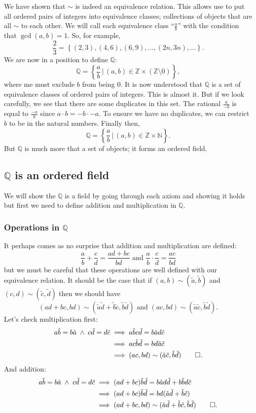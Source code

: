\documentclass[]{scrartcl}
\theoremstyle{definition}
\newcommand{\bb}[1]{\mathbb{#1}}
\newcommand{\Z}{\bb{Z}}
\newcommand{\Q}{\bb{Q}}
\newcommand{\N}{\bb{N}}
\newcommand{\AND}{\;\wedge\;}
\begin{document}
We have shown that $\sim$ is indeed an equivalence relation. This allows use to put all ordered pairs of integers into equivalence classes; collections of objects that are all $\sim$ to each other. We will call each equivalence class ``$\frac{a}{b}$'' with the condition that $\gcd(a,b) = 1$. So, for example,
$$
\frac{2}{3} = \left\{ (2, 3), (4, 6), (6,9), ..., (2n, 3n), ... \right\}.
$$
We are now in a position to define $\Q$:
$$
\Q = \left\{ \frac{a}{b}\,|\,(a,b)\in \Z \times (\Z \setminus 0) \right\},
$$
where me must exclude $b$ from being $0$. It is now understood that $\Q$ is a set of equivalence classes of ordered pairs of integers. This is almost it. But if we look carefully, we see that there are some duplicates in this set. The rational $\frac{a}{-b}$ is equal to $\frac{-a}{b}$ since $a\cdot b = -b\cdot -a$. To ensure we have no duplicates, we can restrict $b$ to be in the natural numbers. Finally then,
$$
\Q = \left\{ \frac{a}{b}\,|\,(a,b)\in \Z \times \N \right\}.
$$
But $\Q$ is much more that a set of objects; it forms an ordered field.

\subsection{$\Q$ is an ordered field}
We will show the $\Q$ is a field by going through each axiom and showing it holds but first we need to define addition and multiplication in $\Q$.
\subsubsection{Operations in $\Q$}
It perhaps comes as no surprise that addition and multiplication are defined:
$$
\frac{a}{b} + \frac{c}{d} = \frac{ad+bc}{bd}\text{ and }\frac{a}{b}\cdot\frac{c}{d}=\frac{ac}{bd}
$$
but we must be careful that these operations are well defined with our equivalence relation. It should be the case that if $(a,b) \sim (\tilde{a}, \tilde{b})$ and $(c,d) \sim (\tilde{c}, \tilde{d})$ then we should have 
$$
(ad+bc, bd) \sim (\tilde{a}\tilde{d} + \tilde{b}\tilde{c}, \tilde{b}\tilde{d})
\text{ and }
(ac,bd) \sim (\tilde{a}\tilde{c}, \tilde{b}\tilde{d}).
$$
Let's check multiplication first:
\begin{align*}
a\tilde{b}=b\tilde{a} \AND c\tilde{d}=d\tilde{c}
    &\implies a\tilde{b}c\tilde{d} = b\tilde{a}d\tilde{c} \\
&\implies ac\tilde{b}\tilde{d} = bd\tilde{a}\tilde{c} \\
&\implies (ac,bd) \sim (\tilde{a}\tilde{c}, \tilde{b}\tilde{d}) \qed.
\end{align*}
And addition:
\begin{align*}
a\tilde{b}=b\tilde{a} \AND c\tilde{d}=d\tilde{c}
    &\implies (ad+bc)\tilde{b}\tilde{d} = b\tilde{a}d\tilde{d} + b\tilde{b}d\tilde{c} \\
&\implies (ad+bc)\tilde{b}\tilde{d} = bd(\tilde{a}\tilde{d} + \tilde{b}\tilde{c}) \\
&\implies (ad+bc, bd) \sim (\tilde{a}\tilde{d} + \tilde{b}\tilde{c}, \tilde{b}\tilde{d}) \qed.
\end{align*}
\end{document}
